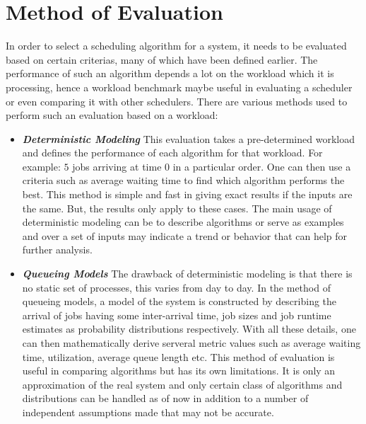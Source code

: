 \section{Method of Evaluation}
In order to select a scheduling algorithm for a system, it needs to be evaluated based on certain criterias, many of which have been defined earlier. The performance of such an algorithm depends a lot on the workload which it is processing, hence a workload benchmark maybe useful in evaluating a scheduler or even comparing it with other schedulers. There are various methods used to perform such an evaluation based on a workload:
\begin{itemize}
\item \textbf{\textit{Deterministic Modeling}} This evaluation takes a pre-determined workload and defines the performance of each algorithm for that workload. For example: $5$ jobs arriving at time $0$ in a particular order. One can then use a criteria such as average waiting time to find which algorithm performs the best. This method is simple and fast in giving exact results if the inputs are the same. But, the results only apply to these cases. The main usage of deterministic modeling can be to describe algorithms or serve as examples and over a set of inputs may indicate a trend or behavior that can help for further analysis. 
\item \textbf{\textit{Queueing Models}} The drawback of deterministic modeling is that there is no static set of processes, this varies from day to day. In the method of queueing models, a model of the system is constructed by describing the arrival of jobs having some inter-arrival time, job sizes and job runtime estimates as probability distributions respectively. With all these details, one can then mathematically derive serveral metric values such as average waiting time, utilization, average queue length etc. This method of evaluation is useful in comparing algorithms but has its own limitations. It is only an approximation of the real system and only certain class of algorithms and distributions can be handled as of now in addition to a number of independent assumptions made that may not be accurate.

\end{itemize}
